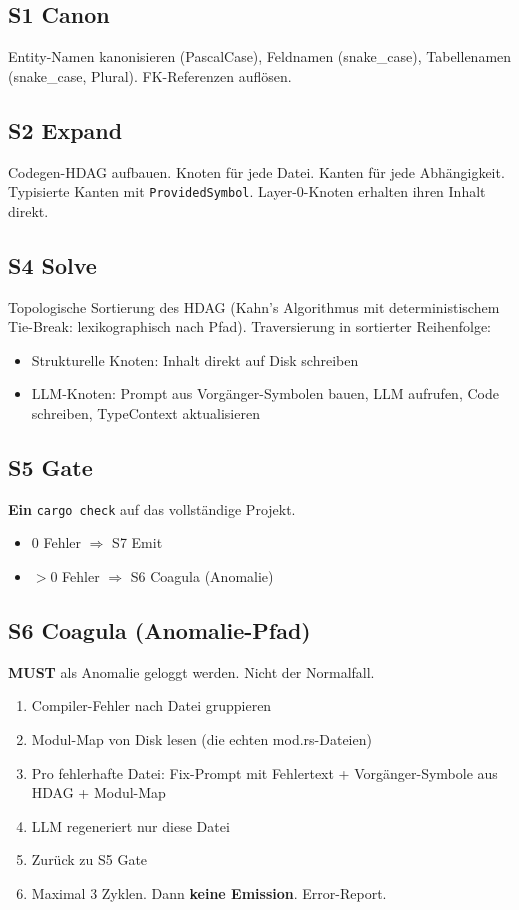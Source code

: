 \documentclass[11pt,a4paper]{article}
\newcommand{\must}{\textbf{MUST}}
\begin{document}
\subsection{S1 Canon}

Entity-Namen kanonisieren (PascalCase), Feldnamen (snake\_case),
Tabellenamen (snake\_case, Plural). FK-Referenzen auflösen.

\subsection{S2 Expand}

Codegen-HDAG aufbauen. Knoten für jede Datei. Kanten für jede
Abhängigkeit. Typisierte Kanten mit \texttt{ProvidedSymbol}.
Layer-0-Knoten erhalten ihren Inhalt direkt.

\subsection{S4 Solve}

Topologische Sortierung des HDAG (Kahn's Algorithmus mit
deterministischem Tie-Break: lexikographisch nach Pfad).
Traversierung in sortierter Reihenfolge:
\begin{itemize}[nosep]
\item Strukturelle Knoten: Inhalt direkt auf Disk schreiben
\item LLM-Knoten: Prompt aus Vorgänger-Symbolen bauen,
  LLM aufrufen, Code schreiben, TypeContext aktualisieren
\end{itemize}

\subsection{S5 Gate}

\textbf{Ein} \texttt{cargo check} auf das vollständige Projekt.
\begin{itemize}[nosep]
\item 0 Fehler $\Rightarrow$ S7 Emit
\item $>0$ Fehler $\Rightarrow$ S6 Coagula (Anomalie)
\end{itemize}

\subsection{S6 Coagula (Anomalie-Pfad)}

\must{} als Anomalie geloggt werden. Nicht der Normalfall.

\begin{enumerate}[nosep]
\item Compiler-Fehler nach Datei gruppieren
\item Modul-Map von Disk lesen (die echten mod.rs-Dateien)
\item Pro fehlerhafte Datei: Fix-Prompt mit Fehlertext +
  Vorgänger-Symbole aus HDAG + Modul-Map
\item LLM regeneriert nur diese Datei
\item Zurück zu S5 Gate
\item Maximal 3 Zyklen. Dann \textbf{keine Emission}. Error-Report.
\end{enumerate}
\end{document}
